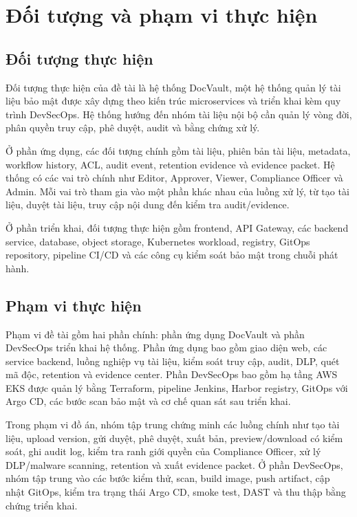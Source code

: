 \section{Đối tượng và phạm vi thực hiện}

\subsection{Đối tượng thực hiện}

Đối tượng thực hiện của đề tài là hệ thống DocVault, một hệ thống quản lý tài liệu bảo mật được xây dựng theo kiến trúc microservices và triển khai kèm quy trình DevSecOps. Hệ thống hướng đến nhóm tài liệu nội bộ cần quản lý vòng đời, phân quyền truy cập, phê duyệt, audit và bằng chứng xử lý.

Ở phần ứng dụng, các đối tượng chính gồm tài liệu, phiên bản tài liệu, metadata, workflow history, ACL, audit event, retention evidence và evidence packet. Hệ thống có các vai trò chính như Editor, Approver, Viewer, Compliance Officer và Admin. Mỗi vai trò tham gia vào một phần khác nhau của luồng xử lý, từ tạo tài liệu, duyệt tài liệu, truy cập nội dung đến kiểm tra audit/evidence.

Ở phần triển khai, đối tượng thực hiện gồm frontend, API Gateway, các backend service, database, object storage, Kubernetes workload, registry, GitOps repository, pipeline CI/CD và các công cụ kiểm soát bảo mật trong chuỗi phát hành.

\subsection{Phạm vi thực hiện}

Phạm vi đề tài gồm hai phần chính: phần ứng dụng DocVault và phần DevSecOps triển khai hệ thống. Phần ứng dụng bao gồm giao diện web, các service backend, luồng nghiệp vụ tài liệu, kiểm soát truy cập, audit, DLP, quét mã độc, retention và evidence center. Phần DevSecOps bao gồm hạ tầng AWS EKS được quản lý bằng Terraform, pipeline Jenkins, Harbor registry, GitOps với Argo CD, các bước scan bảo mật và cơ chế quan sát sau triển khai.

Trong phạm vi đồ án, nhóm tập trung chứng minh các luồng chính như tạo tài liệu, upload version, gửi duyệt, phê duyệt, xuất bản, preview/download có kiểm soát, ghi audit log, kiểm tra ranh giới quyền của Compliance Officer, xử lý DLP/malware scanning, retention và xuất evidence packet. Ở phần DevSecOps, nhóm tập trung vào các bước kiểm thử, scan, build image, push artifact, cập nhật GitOps, kiểm tra trạng thái Argo CD, smoke test, DAST và thu thập bằng chứng triển khai.

